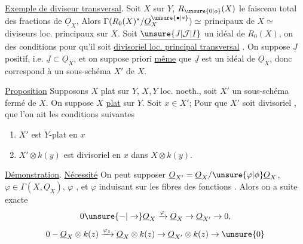 \uline{Exemple de diviseur transversal}. Soit $X$  sur $Y$,  $R_{\unsure{0|o}}(X)$ le faisceau total des fractions de $\underline{O}_X$,  Alors $\Gamma(R_0(X)^*/\underline{O}_X^{\unsure{\bullet|*}})\simeq$      principaux de $X\simeq$ diviseurs loc. principaux sur $X$. Soit $\underline{\unsure{J|\mathcal{J}|I}}$ un idéal de $R_0(X)$, on  des conditions pour qu'il soit  \uline{divisoriel loc. principal transversal} \deleted{$\unsure{\xi}$}. On suppose $\underline{J}$ positif, i.e. $\underline{J}\subset\underline{O}_X$, et on suppose  priori \uline{même} que $\underline{J}$ est un idéal de $\underline{O}_X$, \deleted{$\unsure{\xi}$} donc correspond à un sous-schéma $X'$ de $X$.

\uline{Proposition} Supposons $X$ plat sur $Y$, $X,Y$ loc. noeth., soit $X'$ un sous-schéma fermé de $X$. On suppose $X$ \uline{plat} sur $Y$. Soit $x\in X'$;  Pour que $X'$ soit divisoriel  ,  que l'on ait les conditions suivantes

\begin{enumerate}[label=(\roman*)]
\item $X'$ est $Y$-plat en $x$
\item $X'\otimes k(y)$ est divisoriel  en $x$ dans $X\otimes k(y)$.
\end{enumerate}

\uline{Démonstration}. \uline{Nécessité} On peut supposer $\underline{O}_{X'}=\underline{O}_X/\unsure{\varphi|\phi}\underline{O}_X$, $\varphi\in\Gamma(X,\underline{O}_X)$, $\varphi$    \uline{}, et $\varphi$ induisant sur les fibres des fonctions . Alors on a  suite exacte
\[
0\unsure{-|\to}\underline{O}_X\xrightarrow{\varphi}\underline{O}_X\to\underline{O}_{X'}\to0,
\]
  
\[
0-\underline{O}_X\otimes k(z)\xrightarrow{\varphi_z}\underline{O}_X\otimes k(z)\to\underline{O}_{X'}\otimes k(z)\to\unsure{0}
\]
